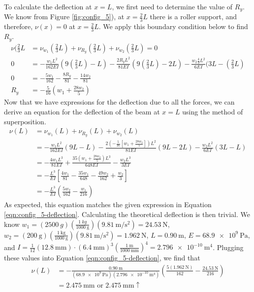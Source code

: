 \documentclass[12 pt]{article}
\begin{document}
To calculate the deflection at $x=L$, we first need to determine the value of $R_y$. We know from Figure \ref{fig:config_5}), at $x=\frac{2}{3}L$ there is a roller support, and therefore, $\nu(x)=0$ at $x=\frac{2}{3}L$. We apply this boundary condition below to find $R_y$.
\begin{align*}
	\nu(\frac{2}{3}L&=\nu_{w_1}(\frac{2}{3}L)+\nu_{R_y}(\frac{2}{3}L)+\nu_{w_2}(\frac{2}{3}L)=0\\
	0&=-\frac{w_1L^2}{162EI}(9(\frac{2}{3}L)-L)-\frac{2R_yL^2}{81EI}(9(\frac{2}{3}L)-2L)-\frac{w_2\frac{4}{9}L^2}{6EI}(3L-(\frac{2}{3}L)\\
	0&=-\frac{5w_1}{162}-\frac{8R_y}{81}-\frac{14w_2}{81}\\
	R_y&=-\frac{5}{16}(w_1+\frac{28w_2}{5})	
\end{align*}
Now that we have expressions for the deflection due to all the forces, we can derive an equation for the deflection of the beam at $x=L$ using the method of superposition.
\begin{align*}
	\nu(L)&=\nu_{w_1}(L)+\nu_{R_y}(L)+\nu_{w_2}(L)\\
	&=-\frac{w_1L^2}{162EI}(9L-L)-\frac{2\left(-\frac{5}{16}\left[w_1+\frac{28w_2}{5}\right]\right)L^2}{81EI}(9L-2L)-\frac{w_2L^2}{6EI}(3L-L)\\
	&=-\frac{4w_1L^3}{81EI}+\frac{35\left(w_1+\frac{28w_2}{5}\right)L^3}{648EI}-\frac{w_2L^3}{3EI}\\
	&=-\frac{L^3}{EI}\left[\frac{4w_1}{81}-\frac{35w_1}{648}-\frac{49w_2}{162}+\frac{w_2}{3}\right]\\
	&=-\frac{L^3}{EI}\left(\frac{5w_2}{162}-\frac{w_1}{216}\right)
\end{align*}
As expected, this equation matches the given expression in Equation \ref{eqn:config_5-deflection}. Calculating the theoretical deflection is then trivial. We know $w_1=(\qty{2500}{g})(\frac{\qty{1}{kg}}{\qty{1000}{\g}})(\qty[per-mode=fraction]{9.81}{\m\per\s\squared})=\qty{24.53}{\N}$, $w_2=(\qty{200}{\g})(\frac{\qty{1}{\kg}}{\qty{1000}{\g}})(\qty[per-mode=fraction]{9.81}{\m\per\s\squared})=\qty{1.962}{\N}$, $L=\qty{0.90}{\m}$, $E=\qty{68.9e9}{\Pa}$, and $I=\frac{1}{12}(\qty{12.8}{\mm})\cdot(\qty{6.4}{\mm})^3(\frac{\qty{1}{\m}}{\qty{1000}{\mm}})^4=\qty{2.796e-10}{\m^4}$. Plugging these values into Equation \ref{eqn:config_5-deflection}, we find that
\begin{align*}
	\nu(L)&=-\frac{\qty{0.90}{\m}}{(\qty{68.9e9}{\Pa})(\qty{2.796e-10}{\m^4})}\left(\frac{5(\qty{1.962}{\N})}{162}-\frac{\qty{24.53}{\N}}{216}\right)\\
	&=\qty{2.475}{\mm}\text{ or }\qty{2.475}{\mm}\uparrow
\end{align*}
\end{document}
